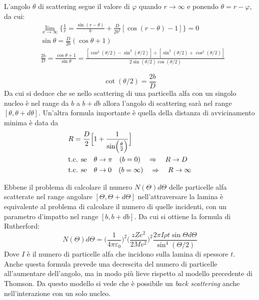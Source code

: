 L'angolo $\theta$ di scattering segue il valore di $\varphi$ quando $r \rightarrow \infty $ e ponendo $\theta = r - \varphi $, da cui:
\begin{equation}
\begin{split}
& \lim_{x\to\infty} \bigg\{  \frac{1}{r} = \frac{\sin(r - \theta)}{b} + \frac{D}{2 b^2} [ \cos (r - \theta) - 1 ] \bigg\} = 0 \\
& \sin \theta = \frac{D}{2 b} (\cos \theta + 1) \\
& \frac{2 b }{D} = \frac{\cos \theta + 1}{\sin \theta} = \frac{ [\cos^2 (\theta /2) - \sin^2 (\theta /2) ] + [ \sin^2(\theta /2) + \cos^2(\theta /2) ] }{  2 \sin(\theta /2) \cos(\theta /2)  }
\end{split}
\end{equation}

\begin{equation}
\cot(\theta /2) = \frac{2 b}{D}
\label{angolo_di_scattering}
\end{equation}
Da cui si deduce che se nello scattering di una particella alfa con un singolo nucleo è nel range da $b$ a $b + db$ allora l'angolo di scattering sarà nel range $[\theta, \theta + d\theta]$.
Un'altra formula importante è quella della distanza di avvicinamento minima è data da
\begin{equation}
\begin{split}
& R = \frac{ D}{2 } \Bigl[ 1 + \frac{ 1}{\sin\Bigl(  \frac{\theta}{2 }  \Bigr) } \Bigr] \\
& \mbox{t.c. se} \quad \theta \to \pi \quad (b=0) \quad \Rightarrow \quad R \to D \\
& \mbox{t.c. se} \quad \theta \to 0 \quad (b=\infty) \quad \Rightarrow \quad R \to \infty
\end{split}
\end{equation}

Ebbene il problema di calcolare il numero $ N(\Theta) d\Theta$ delle particelle alfa scatterate nel range angolare $[\Theta, \Theta +d\Theta]$ nell'attraversare la lamina è equivalente al problema di calcolare il numero di quelle incidenti, con un parametro d'impatto nel range $[b, b +db]$.
Da cui si ottiene la formula di Rutherford:
\begin{equation}
N(\Theta)d\Theta = \biggl( \frac{1}{4\pi \varepsilon_0} \biggr) ^2  \biggl( \frac{z Z e^2}{2 M v^2} \biggr)^2  \frac{ 2 \pi I \rho t  \sin\Theta d\Theta }{ \sin^4(\Theta/2) }
\label{scattering_rutherford}
\end{equation}
Dove $I$ è il numero di particelle alfa che incidono sulla lamina di spessore $t$.
Anche questa formula prevede una decrescita del numero di particelle all'aumentare dell'angolo, ma in modo più lieve rispetto al modello precedente di Thomson.
Da questo modello si vede che è possibile un \textit{back scattering} anche nell'interazione con un solo nucleo.

